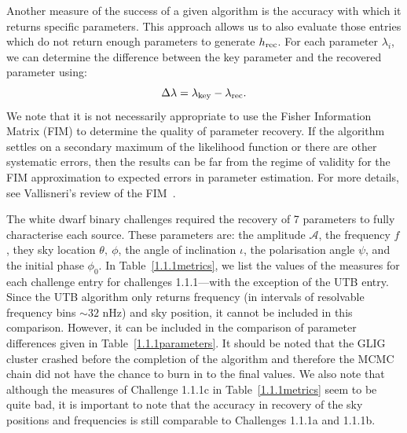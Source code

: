 \documentclass[12pt]{iopart}
\begin{document}
Another measure of the success of a given algorithm is the accuracy with which it returns specific parameters. This approach allows us to also evaluate those entries which do not return enough parameters to generate $h_{\rm rec}$. For each parameter $\lambda_i$, we can determine the difference between the key parameter and the recovered parameter using:
\begin{equation}
\Delta\lambda = \lambda_{\rm key} - \lambda_{\rm rec}.
\end{equation}
We note that it is not necessarily appropriate to use the Fisher Information Matrix (FIM) to determine the quality of parameter recovery. If the algorithm settles on a secondary maximum of the likelihood function or there are other systematic errors, then the results can be far from the regime of validity for the FIM approximation to expected errors in parameter estimation. For more details, see Vallisneri's review of the FIM~\cite{vallisneri07}.

The white dwarf binary challenges required the recovery of 7 parameters to fully characterise each source. These parameters are: the amplitude $\mathcal{A}$, the frequency $f$, they sky location $\theta,~\phi$, the angle of inclination $\iota$, the polarisation angle $\psi$, and the initial phase $\phi_0$. In Table~\ref{1.1.1metrics}, we list the values of the measures for each challenge entry for challenges 1.1.1---with the exception of the UTB entry. Since the UTB algorithm only returns frequency (in intervals of resolvable frequency bins $\sim 32$ nHz) and sky position, it cannot be included in this comparison. However, it can be included in the comparison of parameter differences given in Table~\ref{1.1.1parameters}. It should be noted that the GLIG cluster crashed before the completion of the algorithm and therefore the MCMC chain did not have the chance to burn in to the final values. We also note that although the measures of Challenge 1.1.1c in Table~\ref{1.1.1metrics} seem to be quite bad, it is important to note that the accuracy in recovery of the sky positions and frequencies is still comparable to Challenges 1.1.1a and 1.1.1b.
\end{document}
